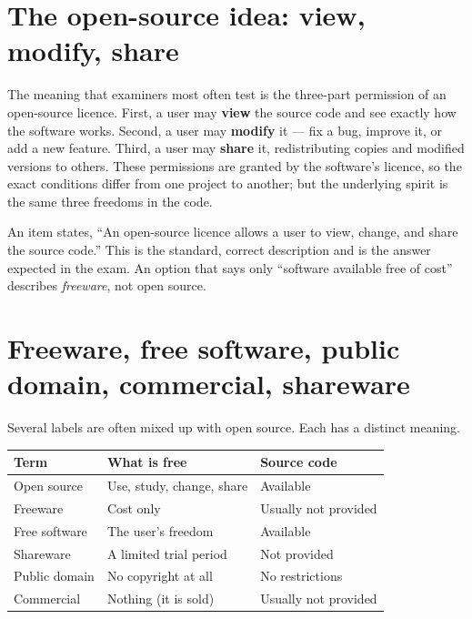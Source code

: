 \section{The open-source idea: view, modify, share}
The meaning that examiners most often test is the three-part permission of an
open-source licence. First, a user may \textbf{view} the source code and see
exactly how the software works. Second, a user may \textbf{modify} it --- fix a
bug, improve it, or add a new feature. Third, a user may \textbf{share} it,
redistributing copies and modified versions to others. These permissions are
granted by the software's licence, so the exact conditions differ from one
project to another; but the underlying spirit is the same three freedoms in
the code.

\begin{example}
An item states, ``An open-source licence allows a user to view, change, and
share the source code.'' This is the standard, correct description and is the
answer expected in the exam. An option that says only ``software available
free of cost'' describes \emph{freeware}, not open source.
\end{example}

\section{Freeware, free software, public domain, commercial, shareware}
Several labels are often mixed up with open source. Each has a distinct
meaning.

\begin{center}
\begin{tabular}{p{}p{}p{}}
\toprule
\textbf{Term} & \textbf{What is free} & \textbf{Source code} \\
\midrule
Open source & Use, study, change, share & Available \\
Freeware & Cost only & Usually not provided \\
Free software & The user's freedom & Available \\
Shareware & A limited trial period & Not provided \\
Public domain & No copyright at all & No restrictions \\
Commercial & Nothing (it is sold) & Usually not provided \\
\bottomrule
\end{tabular}
\end{center}

